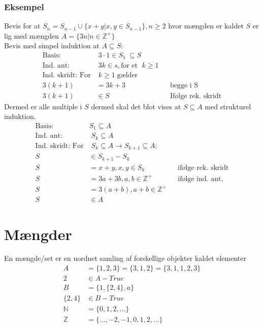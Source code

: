 \documentclass[12pt, a4paper]{article}
\begin{document}
				\subsubsection{Eksempel}
					Bevis for at $S_n=S_{n-1}\cup \{x+y|x,y\in S_{n-1}\}, n \geq 2$ hvor mængden er kaldet $S$ er lig med mængden $A=\{3n|n\in\mathbb{Z}^+\}$\\
					Bevis med simpel induktion at $A\subseteq S$:\\
					\begin{align*}
						\text{Basis:}&\; 3\cdot 1 \in S_1\ \subseteq S\\
						\text{Ind. ant:}&\;3k\in s, \text{for et }\; k\geq 1\\
						\text{Ind. skridt: For}&\; k\geq 1 \; \text{gælder}\\
						3(k+1)&=3k+3 &&\text{begge i S}\\
						3(k+1)&\in S &&\text{Ifølge rek. skridt}
					\end{align*}
					Dermed er alle multiple i $S$ dermed skal det blot vises at $S\subseteq A$ med strukturel induktion.
					\begin{align*}
						\text{Basis:}\;& S_1 \subseteq A\\
						\text{Ind. ant:}&\;S_k\subseteq A\\
						\text{Ind. skridt: For}&\; S_k \subseteq A \rightarrow S_{k+1}\subseteq A:\\
						S&\in S_{k+1}-S_k\\
						S&=x+y, x,y\in S_k && \text{ifølge rek. skridt}\\
						S&=3a+3b, a,b\in \mathbb{Z}^+&&\text{ifølge ind. ant.}\\
						S&=3(a+b), a+b\in\mathbb{Z}^+\\
						S&\in A
					\end{align*}
		\section{Mængder} 
			En mængde/set er en uordnet samling af forskellige objekter kaldet elementer\\
			\begin{align*}
				A&=\{1,2,3\}=\{3,1,2\}=\{3,1,1,2,3\}\\
				2&\in A - True\\
				B&=\{1,\{2,4\},a\}\\
				\{2,4\}&\in B - True\\[5mm]
				\mathbb{N}&=\{0,1,2,...\}\\
				\mathbb{Z}&=\{...,-2,-1,0,1,2,...\}
			\end{align*}
\end{document}

